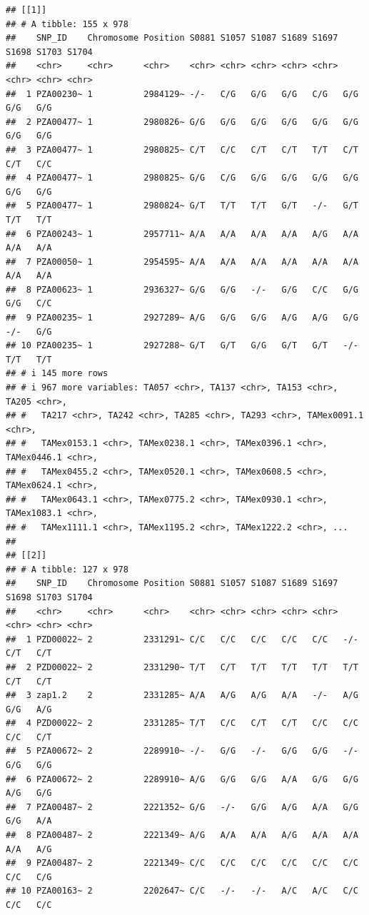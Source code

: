 \documentclass[
]{article}
\begin{document}
\begin{verbatim}
## [[1]]
## # A tibble: 155 x 978
##    SNP_ID    Chromosome Position S0881 S1057 S1087 S1689 S1697 S1698 S1703 S1704
##    <chr>     <chr>      <chr>    <chr> <chr> <chr> <chr> <chr> <chr> <chr> <chr>
##  1 PZA00230~ 1          2984129~ -/-   C/G   G/G   G/G   C/G   G/G   G/G   G/G  
##  2 PZA00477~ 1          2980826~ G/G   G/G   G/G   G/G   G/G   G/G   G/G   G/G  
##  3 PZA00477~ 1          2980825~ C/T   C/C   C/T   C/T   T/T   C/T   C/T   C/C  
##  4 PZA00477~ 1          2980825~ G/G   C/G   G/G   G/G   G/G   G/G   G/G   G/G  
##  5 PZA00477~ 1          2980824~ G/T   T/T   T/T   G/T   -/-   G/T   T/T   T/T  
##  6 PZA00243~ 1          2957711~ A/A   A/A   A/A   A/A   A/G   A/A   A/A   A/A  
##  7 PZA00050~ 1          2954595~ A/A   A/A   A/A   A/A   A/A   A/A   A/A   A/A  
##  8 PZA00623~ 1          2936327~ G/G   G/G   -/-   G/G   C/C   G/G   G/G   C/C  
##  9 PZA00235~ 1          2927289~ A/G   G/G   G/G   A/G   A/G   G/G   -/-   G/G  
## 10 PZA00235~ 1          2927288~ G/T   G/T   G/G   G/T   G/T   -/-   T/T   T/T  
## # i 145 more rows
## # i 967 more variables: TA057 <chr>, TA137 <chr>, TA153 <chr>, TA205 <chr>,
## #   TA217 <chr>, TA242 <chr>, TA285 <chr>, TA293 <chr>, TAMex0091.1 <chr>,
## #   TAMex0153.1 <chr>, TAMex0238.1 <chr>, TAMex0396.1 <chr>, TAMex0446.1 <chr>,
## #   TAMex0455.2 <chr>, TAMex0520.1 <chr>, TAMex0608.5 <chr>, TAMex0624.1 <chr>,
## #   TAMex0643.1 <chr>, TAMex0775.2 <chr>, TAMex0930.1 <chr>, TAMex1083.1 <chr>,
## #   TAMex1111.1 <chr>, TAMex1195.2 <chr>, TAMex1222.2 <chr>, ...
## 
## [[2]]
## # A tibble: 127 x 978
##    SNP_ID    Chromosome Position S0881 S1057 S1087 S1689 S1697 S1698 S1703 S1704
##    <chr>     <chr>      <chr>    <chr> <chr> <chr> <chr> <chr> <chr> <chr> <chr>
##  1 PZD00022~ 2          2331291~ C/C   C/C   C/C   C/C   C/C   -/-   C/T   C/T  
##  2 PZD00022~ 2          2331290~ T/T   C/T   T/T   T/T   T/T   T/T   C/T   C/T  
##  3 zap1.2    2          2331285~ A/A   A/G   A/G   A/A   -/-   A/G   G/G   A/G  
##  4 PZD00022~ 2          2331285~ T/T   C/C   C/T   C/T   C/C   C/C   C/C   C/T  
##  5 PZA00672~ 2          2289910~ -/-   G/G   -/-   G/G   G/G   -/-   G/G   G/G  
##  6 PZA00672~ 2          2289910~ A/G   G/G   G/G   A/A   G/G   G/G   A/G   G/G  
##  7 PZA00487~ 2          2221352~ G/G   -/-   G/G   A/G   A/A   G/G   G/G   A/A  
##  8 PZA00487~ 2          2221349~ A/G   A/A   A/A   A/G   A/A   A/A   A/A   A/G  
##  9 PZA00487~ 2          2221349~ C/C   C/C   C/C   C/C   C/C   C/C   C/C   C/G  
## 10 PZA00163~ 2          2202647~ C/C   -/-   -/-   A/C   A/C   C/C   C/C   C/C  

\end{verbatim}
\end{document}
